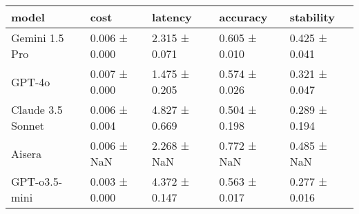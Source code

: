 \begin{tabular}{lllll}
\toprule
model & cost & latency & accuracy & stability \\
\midrule
Gemini 1.5 Pro & 0.006 ± 0.000 & 2.315 ± 0.071 & 0.605 ± 0.010 & 0.425 ± 0.041 \\
GPT-4o & 0.007 ± 0.000 & 1.475 ± 0.205 & 0.574 ± 0.026 & 0.321 ± 0.047 \\
Claude 3.5 Sonnet & 0.006 ± 0.004 & 4.827 ± 0.669 & 0.504 ± 0.198 & 0.289 ± 0.194 \\
Aisera & 0.006 ± NaN & 2.268 ± NaN & 0.772 ± NaN & 0.485 ± NaN \\
GPT-o3.5-mini & 0.003 ± 0.000 & 4.372 ± 0.147 & 0.563 ± 0.017 & 0.277 ± 0.016 \\
\bottomrule
\end{tabular}
